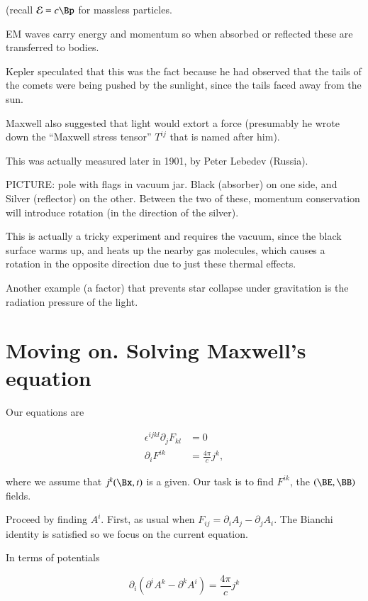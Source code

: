 (recall $\mathcal{E} = c\mathcal{\Bp}$ for massless particles.

EM waves carry energy and momentum so when absorbed or reflected these are transferred to bodies.

Kepler speculated that this was the fact because he had observed that the tails of the comets were being pushed by the sunlight, since the tails faced away from the sun.

Maxwell also suggested that light would extort a force (presumably he wrote down the ``Maxwell stress tensor'' $T^{ij}$ that is named after him).

This was actually measured later in 1901, by Peter Lebedev (Russia).

PICTURE: pole with flags in vacuum jar.  Black (absorber) on one side, and Silver (reflector) on the other.  Between the two of these, momentum conservation will introduce rotation (in the direction of the silver).

This is actually a tricky experiment and requires the vacuum, since the black surface warms up, and heats up the nearby gas molecules, which causes a rotation in the opposite direction due to just these thermal effects.

Another example (a factor) that prevents star collapse under gravitation is the radiation pressure of the light.

\section{Moving on.  Solving Maxwell's equation}

Our equations are

\begin{align}\label{eqn:relativisticElectrodynamicsL17:210}
\epsilon^{i j k l} \partial_j F_{k l} &= 0 \\
\partial_i F^{i k} &= \frac{4 \pi}{c} j^k,
\end{align}

where we assume that $j^k(\Bx, t)$ is a given.  Our task is to find $F^{i k}$, the $(\BE, \BB)$ fields.

Proceed by finding $A^i$.  First, as usual when $F_{i j} = \partial_i A_j - \partial_j A_i$.  The Bianchi identity is satisfied so we focus on the current equation.

In terms of potentials

\begin{equation}\label{eqn:relativisticElectrodynamicsL17:230}
\partial_i (\partial^i A^k - \partial^k A^i) = \frac{ 4 \pi}{c} j^k
\end{equation}

